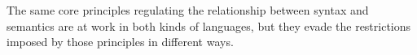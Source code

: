 \documentclass[output=paper]{langsci/langscibook}
\begin{document}
\z
The same core principles regulating the relationship between syntax and
se\-man\-tics are at work in both kinds of languages, but they evade the
restrictions imposed by those principles in different ways.

%
%
%
%
%
%
%
%
\end{document}
